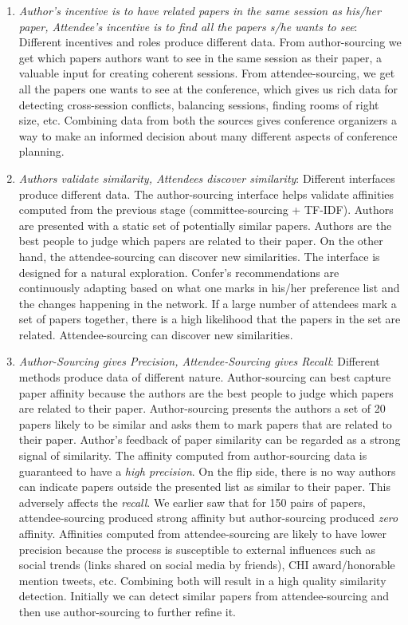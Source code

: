 \documentclass[letterpaper]{article}
\begin{document}
\begin{enumerate}
\item \emph{Author's incentive is to have related papers in the same session as his/her paper, Attendee's incentive is to find all the papers s/he wants to see}: Different incentives and roles produce different data. From author-sourcing we get which papers authors want to see in the same session as their paper, a valuable input for creating coherent sessions. From attendee-sourcing, we get all the papers one wants to see at the conference, which gives us rich data for detecting cross-session conflicts, balancing sessions, finding rooms of right size, etc. Combining data from both the sources gives conference organizers a way to make an informed decision about many different aspects of conference planning.

\item \emph{Authors validate similarity, Attendees discover similarity}: Different interfaces produce different data. The author-sourcing interface helps validate affinities computed from the previous stage (committee-sourcing + TF-IDF). Authors are presented with a static set of potentially similar papers. Authors are the best people to judge which papers are related to their paper. On the other hand, the attendee-sourcing can discover new similarities. The interface is designed for a natural exploration. Confer's recommendations are continuously adapting based on what one marks in his/her preference list and the changes happening in the network. If a large number of attendees mark a set of papers together, there is a high likelihood that the papers in the set are related. Attendee-sourcing can discover new similarities.

\item \emph{Author-Sourcing gives Precision, Attendee-Sourcing gives Recall}: Different methods produce data of different nature. Author-sourcing can best capture paper affinity because the authors are the best people to judge which papers are related to their paper.  Author-sourcing presents the authors a set of 20 papers likely to be similar and asks them to mark papers that are related to their paper. Author's feedback of paper similarity can be regarded as a strong signal of similarity. The affinity computed from author-sourcing data is guaranteed to have a \emph{high precision}. On the flip side, there is no way authors can indicate papers outside the presented list as similar to their paper. This adversely affects the \emph{recall}. We earlier saw that for 150 pairs of papers, attendee-sourcing produced strong affinity but author-sourcing produced \emph{zero} affinity. Affinities computed from attendee-sourcing are likely to have lower precision because the process is susceptible to external influences such as social trends (links shared on social media by friends), CHI award/honorable mention tweets, etc. Combining both will result in a high quality similarity detection. Initially we can detect similar papers from attendee-sourcing and then use author-sourcing to further refine it.
 \end {enumerate}
\end{document}
